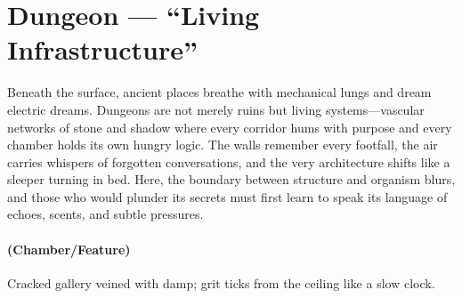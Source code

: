 \section{Dungeon --- ``Living Infrastructure''}
\label{chap:dungeon-generator}

\begin{tcolorbox}[colback=black!3,colframe=black!40!white,title={Theme \& Atmosphere}]
Beneath the surface, ancient places breathe with mechanical lungs and dream electric dreams. Dungeons are not merely ruins but living systems—vascular networks of stone and shadow where every corridor hums with purpose and every chamber holds its own hungry logic. The walls remember every footfall, the air carries whispers of forgotten conversations, and the very architecture shifts like a sleeper turning in bed. Here, the boundary between structure and organism blurs, and those who would plunder its secrets must first learn to speak its language of echoes, scents, and subtle pressures.
\end{tcolorbox}

\paragraph*{(Chamber/Feature)} Cracked gallery veined with damp; grit ticks from the ceiling like a slow clock.

